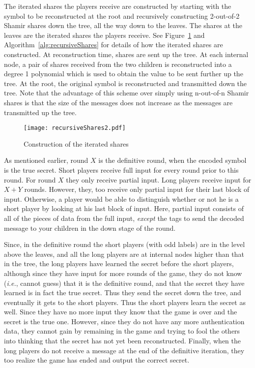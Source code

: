 \documentclass[12pt]{article}
\theoremstyle{definition}
\newcommand{\ie}{\emph{i.e.}}
\begin{document}
The iterated shares the players receive are constructed by 
starting with the symbol to be reconstructed at the root and 
recursively constructing 2-out-of-2 Shamir shares down the tree, all 
the way down to the leaves. The shares at the leaves are the iterated 
shares the players receive. See Figure~\ref{fig:shares} and 
Algorithm~\ref{alg:recursiveShares} for details of how the iterated shares are 
constructed. At reconstruction time, shares are sent 
up the tree. At each internal node, a pair of shares received from 
the two children is reconstructed into a degree 1 polynomial which is used 
to obtain the value to be sent further up the tree. At the root, the 
original symbol is reconstructed and transmitted down the tree.  
Note that the advantage of this scheme 
over simply using n-out-of-n Shamir shares is that the size of the 
messages does not increase as the messages are transmitted up the tree.

\begin{figure}
\begin{center}
\texttt{[image: recursiveShares2.pdf]}
\end{center}
\caption{Construction of the iterated shares}
\label{fig:shares}
\end{figure}



As mentioned earlier, round $X$ is the definitive round, when the 
encoded symbol is the true secret. Short players receive full input 
for every round prior to this round. For round $X$ they only receive 
partial input. Long players receive input for $X+Y$ rounds. However,
they, too receive only partial input for their last block of input. 
Otherwise, a player would be able to distinguish whether or not he is a 
short player by looking at his last block of input.
Here, partial input consists of all of the pieces of data from the full input, 
\emph{except} the tags to send the decoded message to your children in the 
down stage of the round. 

Since, in the definitive round the short players 
(with odd labels) are in the level above the leaves, and all the long 
players are at internal nodes higher than that in the tree, the long players 
have learned the secret before the short players, although since they have
input for more rounds of the game, they do not know (\ie, cannot guess) that 
it is the definitive round, and that the secret they have learned is in 
fact the  true secret. Thus they send the secret down the tree, and 
eventually it gets to the short players. Thus the short players learn 
the secret as well. Since they have no more input they know that the 
game is over and the secret is the true one. However, since they do not 
have any more authentication data, they cannot gain by remaining in the 
game and trying to fool the others into thinking that the secret has not 
yet been reconstructed. Finally, when the long players do not receive a 
message at the end of the definitive iteration, they too realize the 
game has ended and output the correct secret. 
\end{document}

